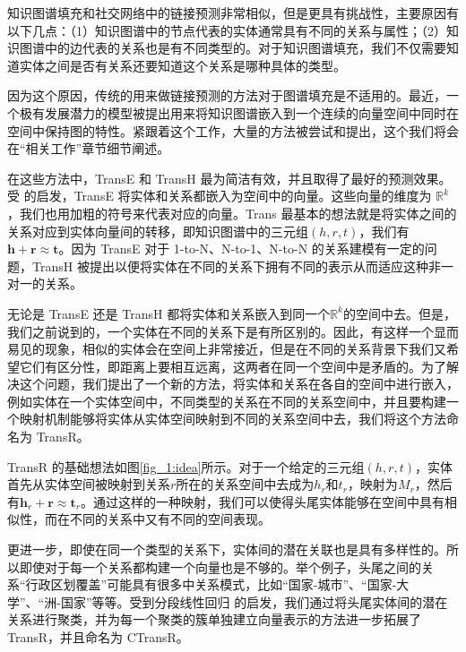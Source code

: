 知识图谱填充和社交网络中的链接预测非常相似，但是更具有挑战性，主要原因有以下几点：（1）知识图谱中的节点代表的实体通常具有不同的关系与属性；（2）知识图谱中的边代表的关系也是有不同类型的。对于知识图谱填充，我们不仅需要知道实体之间是否有关系还要知道这个关系是哪种具体的类型。

因为这个原因，传统的用来做链接预测的方法对于图谱填充是不适用的。最近，一个极有发展潜力的模型被提出用来将知识图谱嵌入到一个连续的向量空间中同时在空间中保持图的特性。紧跟着这个工作，大量的方法被尝试和提出，这个我们将会在``相关工作''章节细节阐述。

在这些方法中，TransE  和 TransH  最为简洁有效，并且取得了最好的预测效果。受  的启发，TransE 将实体和关系都嵌入为空间中的向量。这些向量的维度为 $\mathbb{R}^k$，我们也用加粗的符号来代表对应的向量。Trans 最基本的想法就是将实体之间的关系对应到实体向量间的转移，即知识图谱中的三元组$(h, r, t)$，我们有$\mathbf{h} + \mathbf{r} \approx \mathbf{t}$。因为 TransE 对于 1-to-N、N-to-1、N-to-N 的关系建模有一定的问题，TransH 被提出以便将实体在不同的关系下拥有不同的表示从而适应这种非一对一的关系。

无论是 TransE 还是 TransH 都将实体和关系嵌入到同一个$\mathbb{R}^k$的空间中去。但是，我们之前说到的，一个实体在不同的关系下是有所区别的。因此，有这样一个显而易见的现象，相似的实体会在空间上非常接近，但是在不同的关系背景下我们又希望它们有区分性，即距离上要相互远离，这两者在同一个空间中是矛盾的。为了解决这个问题，我们提出了一个新的方法，将实体和关系在各自的空间中进行嵌入，例如实体在一个实体空间中，不同类型的关系在不同的关系空间中，并且要构建一个映射机制能够将实体从实体空间映射到不同的关系空间中去，我们将这个方法命名为 TransR。

TransR 的基础想法如图\ref{fig_1:idea}所示。对于一个给定的三元组$(h, r, t)$，实体首先从实体空间被映射到关系$r$所在的关系空间中去成为$h_r$和$t_r$，映射为$M_r$，然后有$\mathbf{h}_r + \mathbf{r} \approx \mathbf{t}_r$。通过这样的一种映射，我们可以使得头尾实体能够在空间中具有相似性，而在不同的关系中又有不同的空间表现。

更进一步，即使在同一个类型的关系下，实体间的潜在关联也是具有多样性的。所以即使对于每一个关系都构建一个向量也是不够的。举个例子，头尾之间的关系``行政区划覆盖''可能具有很多中关系模式，比如``国家-城市''、``国家-大学''、``洲-国家''等等。受到分段线性回归  的启发，我们通过将头尾实体间的潜在关系进行聚类，并为每一个聚类的簇单独建立向量表示的方法进一步拓展了TransR，并且命名为 CTransR。
 

